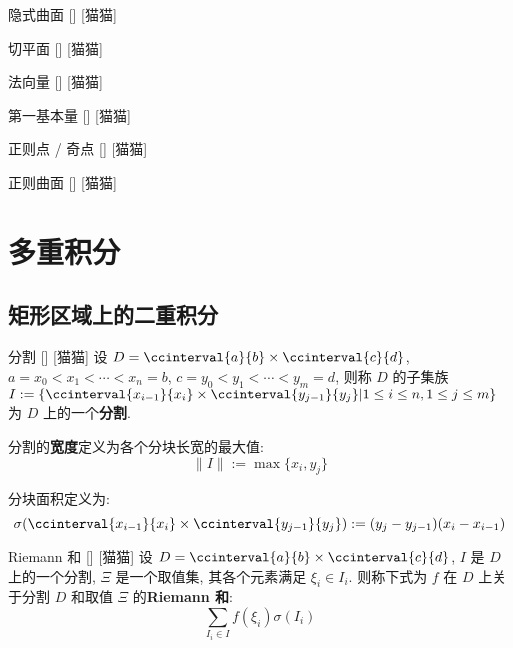 \documentclass[UTF8]{ctexart}
\begin{document}
			\begin{dfn}
				[]
				{隐式曲面}
				[]
				[猫猫]
			\end{dfn}
			
			\begin{dfn}
				[]
				{切平面}
				[]
				[猫猫]
			\end{dfn}
			
			\begin{dfn}
				[]
				{法向量}
				[]
				[猫猫]
			\end{dfn}
			
			\begin{dfn}
				[]
				{第一基本量}
				[]
				[猫猫]
			\end{dfn}
			
			\begin{dfn}
				[]
				{正则点 / 奇点}
				[]
				[猫猫]
			\end{dfn}
			
			\begin{dfn}
				[]
				{正则曲面}
				[]
				[猫猫]
			\end{dfn}
	
	\section{多重积分}
		
		\subsection{矩形区域上的二重积分}

			\begin{dfn}
			    []
			    {分割}
			    []
			    [猫猫]
				设 \(D=\ccinterval{a}{b}\times\ccinterval{c}{d}\), \(a=x_0<x_1<\cdots<x_n=b\), \(c=y_0<y_1<\cdots<y_m=d\), 则称 \(D\) 的子集族 \(I:=\{\ccinterval{x_{i-1}}{x_i}\times\ccinterval{y_{j-1}}{y_j}|1\leq i\leq n, 1\leq j\leq m\}\) 为 \(D\) 上的一个\textbf{分割}. 

				分割的\textbf{宽度}定义为各个分块长宽的最大值: 
				\[\|I\|:=\max\{x_i,y_j\}\]

				分块面积定义为: 
				\[\sigma(\ccinterval{x_{i-1}}{x_i}\times\ccinterval{y_{j-1}}{y_j}):=(y_j-y_{j-1})(x_i-x_{i-1})\]
			\end{dfn}

			\begin{dfn}
			    []
			    {Riemann 和}
			    []
			    [猫猫]
				设 \(D=\ccinterval{a}{b}\times\ccinterval{c}{d}\), \(I\) 是 \(D\) 上的一个分割, \(\Xi\) 是一个取值集, 其各个元素满足 \(\xi_i\in I_i\). 则称下式为 \(f\) 在 \(D\) 上关于分割 \(D\) 和取值 \(\Xi\) 的\textbf{Riemann 和}: 
				\[\sum_{I_i\in I}f(\xi_i)\sigma(I_i)\]
			\end{dfn}
\end{document}
